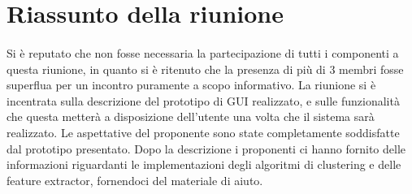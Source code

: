 \section{Riassunto della riunione}
\label{riassunto}
\paragraph{}
Si è reputato che non fosse necessaria la partecipazione di tutti i componenti a questa riunione, in quanto si è ritenuto che la presenza di più di 3 membri fosse superflua per un incontro puramente a scopo informativo. La riunione si è incentrata sulla descrizione del prototipo di GUI\g{} realizzato, e sulle funzionalità che questa metterà a disposizione dell'utente una volta che il sistema sarà realizzato. Le aspettative del proponente sono state completamente soddisfatte dal prototipo presentato. Dopo la descrizione i proponenti ci hanno fornito delle informazioni riguardanti le implementazioni degli algoritmi di clustering\g{} e delle feature extractor\g{}, fornendoci del materiale di aiuto.

